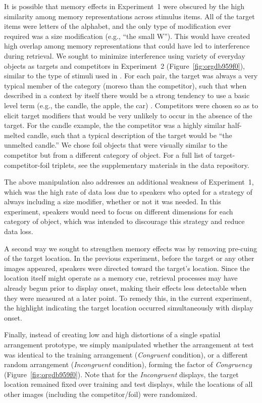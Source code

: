 \documentclass[natbib,man,a4paper]{apa6}
\begin{document}
It is possible that memory effects in Experiment~1 were obscured by the high similarity among memory representations across stimulus items. All of the target items were letters of the alphabet, and the only type of modification ever required was a size modification (e.g., ``the small W''). This would have created high overlap among memory representations that could have led to interference during retrieval. We sought to minimize interference using variety of everyday objects as targets and competitors in Experiment~2 (Figure~\ref{fig:orgdb959f0}), similar to the type of stimuli used in \cite{GannBarr2014}. For each pair, the target was always a very typical member of the category (moreso than the competitor), such that when described in a context by itself there would be a strong tendency to use a basic level term (e.g., the candle, the apple, the car) \citep{roschetal76}. Competitors were chosen so as to elicit target modifiers that would be very unlikely to occur in the absence of the target. For the candle example, the the competitor was a highly similar half-melted candle, such that a typical description of the target would be ``the unmelted candle.''  We chose foil objects that were visually similar to the competitor but from a different category of object. For a full list of target-competitor-foil triplets, see the supplementary materials in the data repository.

The above manipulation also addresses an additional weakness of Experiment~1, which was the high rate of data loss due to speakers who opted for a strategy of always including a size modifier, whether or not it was needed. In this experiment, speakers would need to focus on different dimensions for each category of object, which was intended to discourage this strategy and reduce data loss.

A second way we sought to strengthen memory effects was by removing pre-cuing of the target location. In the previous experiment, before the target or any other images appeared, speakers were directed toward the target's location. Since the location itself might operate as a memory cue, retrieval processes may have already begun prior to display onset, making their effects less detectable when they were measured at a later point.  To remedy this, in the current experiment, the highlight indicating the target location occurred simultaneously with display onset.

Finally, instead of creating low and high distortions of a single spatial arrangement prototype, we simply manipulated whether the arrangement at test was identical to the training arrangement (\emph{Congruent} condition), or a different random arrangement (\emph{Incongruent} condition), forming the factor of \emph{Congruency} (Figure~\ref{fig:orgdb959f0}). Note that for the \emph{Incongruent} displays, the target location remained fixed over training and test displays, while the locations of all other images (including the competitor/foil) were randomized.
\end{document}

